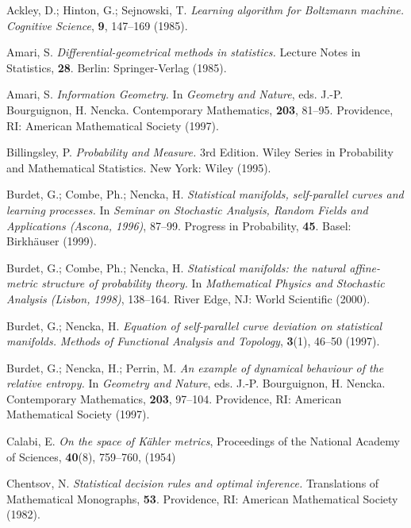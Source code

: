 \begin{thebibliography}{9}

 Ackley, D.; Hinton, G.; Sejnowski, T. \textit{Learning algorithm for Boltzmann machine.} \textit{Cognitive Science}, \textbf{9}, 147--169 (1985).

 Amari, S. \textit{Differential-geometrical methods in statistics.} Lecture Notes in Statistics, \textbf{28}. Berlin: Springer-Verlag (1985).

 Amari, S. \textit{Information Geometry.} In \textit{Geometry and Nature}, eds. J.-P. Bourguignon, H. Nencka. Contemporary Mathematics, \textbf{203}, 81--95. Providence, RI: American Mathematical Society (1997).

 Billingsley, P. \textit{Probability and Measure.} 3rd Edition. Wiley Series in Probability and Mathematical Statistics. New York: Wiley (1995).

 Burdet, G.; Combe, Ph.; Nencka, H. \textit{Statistical manifolds, self-parallel curves and learning processes.} In \textit{Seminar on Stochastic Analysis, Random Fields and Applications (Ascona, 1996)}, 87--99. Progress in Probability, \textbf{45}. Basel: Birkhäuser (1999).

 Burdet, G.; Combe, Ph.; Nencka, H. \textit{Statistical manifolds: the natural affine-metric structure of probability theory.} In \textit{Mathematical Physics and Stochastic Analysis (Lisbon, 1998)}, 138--164. River Edge, NJ: World Scientific (2000).

 Burdet, G.; Nencka, H. \textit{Equation of self-parallel curve deviation on statistical manifolds.} \textit{Methods of Functional Analysis and Topology}, \textbf{3}(1), 46--50 (1997).

 Burdet, G.; Nencka, H.; Perrin, M. \textit{An example of dynamical behaviour of the relative entropy.} In \textit{Geometry and Nature}, eds. J.-P. Bourguignon, H. Nencka. Contemporary Mathematics, \textbf{203}, 97--104. Providence, RI: American Mathematical Society (1997).

 Calabi, E. \textit{On the space of Kähler metrics}, {Proceedings of the National Academy of Sciences}, \textbf{40}(8), {759--760}, (1954)

  
 Chentsov, N. \textit{Statistical decision rules and optimal inference.} Translations of Mathematical Monographs, \textbf{53}. Providence, RI: American Mathematical Society (1982).


\end{thebibliography}
